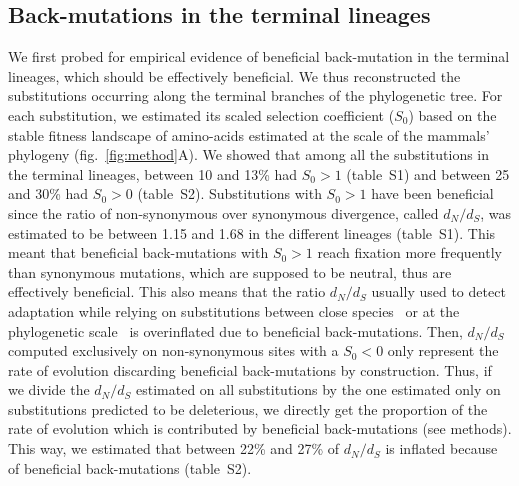\documentclass{article}
\newcommand{\dn}{d_N}
\newcommand{\ds}{d_S}
\newcommand{\dnds}{\dn / \ds}
\newcommand{\Sphy}{S_{0}}
\begin{document}
    \subsection*{Back-mutations in the terminal lineages}
    We first probed for empirical evidence of beneficial back-mutation in the terminal lineages, which should be effectively beneficial.
    We thus reconstructed the substitutions occurring along the terminal branches of the phylogenetic tree.
    For each substitution, we estimated its scaled selection coefficient ($\Sphy$) based on the stable fitness landscape of amino-acids estimated at the scale of the mammals' phylogeny (fig.~\ref{fig:method}A).
    We showed that among all the substitutions in the terminal lineages, between 10 and 13\% had $\Sphy > 1$ (table~S1) and between 25 and 30\% had $\Sphy > 0$ (table~S2).
    Substitutions with $\Sphy > 1$ have been beneficial since the ratio of non-synonymous over synonymous divergence, called $\dnds$, was estimated to be between 1.15 and 1.68 in the different lineages (table~S1).
    This meant that beneficial back-mutations with $\Sphy > 1$ reach fixation more frequently than synonymous mutations, which are supposed to be neutral, thus are effectively beneficial.
    This also means that the ratio $\dnds$ usually used to detect adaptation while relying on substitutions between close species~\cite{mcdonald_adaptative_1991, galtier_adaptive_2016} or at the phylogenetic scale~\cite{goldman_codonbased_1994, yang_codonsubstitution_2002} is overinflated due to beneficial back-mutations.
    Then, $\dnds$ computed exclusively on non-synonymous sites with a $\Sphy < 0$ only represent the rate of evolution discarding beneficial back-mutations by construction.
    Thus, if we divide the $\dnds$ estimated on all substitutions by the one estimated only on substitutions predicted to be deleterious, we directly get the proportion of the rate of evolution which is contributed by beneficial back-mutations (see methods).
    This way, we estimated that between 22\% and 27\% of $\dnds$ is inflated because of beneficial back-mutations (table~S2).
\end{document}
